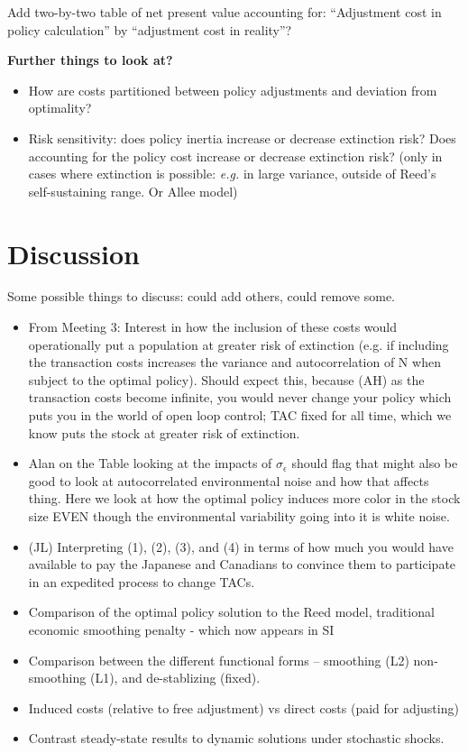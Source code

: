 \documentclass[authoryear, review, 12pt]{elsarticle}
\begin{document}
Add two-by-two table of net present value accounting for:  ``Adjustment cost in policy calculation'' by ``adjustment cost in reality''?

{\color{green}\textbf{Further things to look at?}
\begin{itemize}
  \item How are costs partitioned between policy adjustments and deviation from optimality? 
  \item Risk sensitivity: does policy inertia increase or decrease extinction risk? Does accounting for the policy cost increase or decrease extinction risk?  (only in cases where extinction is possible: \emph{e.g.} in large variance, outside of Reed's self-sustaining range.  Or Allee model)
\end{itemize}
}


\section{Discussion}
{\color{green}Some possible things to discuss: could add others, could remove some.}
\begin{itemize}
\item From Meeting 3: Interest in how the inclusion of these costs would operationally put a population at greater risk of extinction (e.g. if including the transaction costs increases the variance and autocorrelation of N when subject to the optimal policy). Should expect this, because (AH) as the transaction costs become infinite, you would never change your policy which puts you in the world of open loop control; TAC fixed for all time, which we know puts the stock at greater risk of extinction.
\item Alan on the Table looking at the impacts of $\sigma_{\epsilon}$ should flag that might also be good to look at autocorrelated environmental noise and how that affects thing. Here we look at how the optimal policy induces more color in the stock size EVEN though the environmental variability going into it is white noise.
\item (JL) Interpreting  (1), (2), (3), and (4) in terms of how much you would have available to pay the Japanese and Canadians to convince them to participate in an expedited process to change TACs.
\item   Comparison of the optimal policy solution to the Reed model, traditional economic smoothing penalty - which now appears in SI
\item  Comparison between the different functional forms -- smoothing (L2)
  non-smoothing (L1), and de-stablizing (fixed).
\item   Induced costs (relative to free adjustment) vs direct costs (paid for adjusting) 
\item   Contrast steady-state results to dynamic solutions under stochastic shocks.
\end{itemize}
\end{document}
